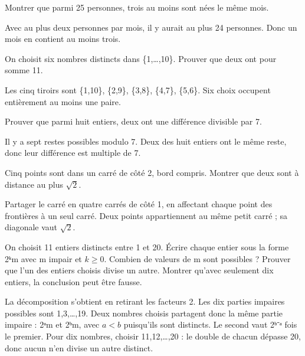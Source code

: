\documentclass[11pt]{article}
\begin{document}
Montrer que parmi 25 personnes, trois au moins sont nées le même mois.\par
Avec au plus deux personnes par mois, il y aurait au plus 24 personnes. Donc un mois en contient au moins trois.\par
{}
On choisit six nombres distincts dans \{1,…,10\}. Prouver que deux ont pour somme 11.\par
Les cinq tiroirs sont \{1,10\}, \{2,9\}, \{3,8\}, \{4,7\}, \{5,6\}. Six choix occupent entièrement au moins une paire.\par
{}
Prouver que parmi huit entiers, deux ont une différence divisible par 7.\par
Il y a sept restes possibles modulo 7. Deux des huit entiers ont le même reste, donc leur différence est multiple de 7.\par
{}
Cinq points sont dans un carré de côté 2, bord compris. Montrer que deux sont à distance au plus \(\sqrt{2}\).\par
Partager le carré en quatre carrés de côté 1, en affectant chaque point des frontières à un seul carré. Deux points appartiennent au même petit carré ; sa diagonale vaut \(\sqrt{2}\).\par
{}
On choisit 11 entiers distincts entre 1 et 20. Écrire chaque entier sous la forme 2ᵏm avec m impair et \(k \geq  0\). Combien de valeurs de m sont possibles ? Prouver que l’un des entiers choisis divise un autre. Montrer qu’avec seulement dix entiers, la conclusion peut être fausse.\par
La décomposition s’obtient en retirant les facteurs 2. Les dix parties impaires possibles sont 1,3,…,19. Deux nombres choisis partagent donc la même partie impaire : 2ᵃm et 2ᵇm, avec \(a < b\) puisqu’ils sont distincts. Le second vaut 2ᵇ⁻ᵃ fois le premier. Pour dix nombres, choisir 11,12,…,20 : le double de chacun dépasse 20, donc aucun n’en divise un autre distinct.\par
\end{document}
